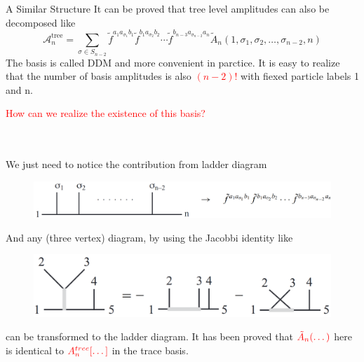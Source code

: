 \documentclass{beamer}
\begin{document}
\begin{frame}{A Similar Structure}
    It can be proved that tree level amplitudes can also be decomposed like 
\begin{equation*}
    \mathcal{A}_n^\text{tree}=\sum_{\sigma\in S_{n-2}}\tilde{f}^{a_1a_{\sigma_1}b_1}\tilde{f}^{b_1a_{\sigma_2}b_2}\cdots\tilde{f}^{b_{n-3}a_{\sigma_{n-2}}a_n}\tilde{A}_n(1,\sigma_1,\sigma_2,\ldots,\sigma_{n-2},n)
\end{equation*}
The basis is called DDM and more convenient in parctice. It is easy to realize that the number of basis amplitudes is also \textcolor{red}{$(n-2)!$} with fiexed particle labels 1 and n.
\end{frame}
\begin{frame}
    \begin{Large}
        \textcolor{red}{How can we realize the existence of this basis?}
    \end{Large}
\\ \hspace*{\fill}\\
We just need to notice the contribution from ladder diagram
\begin{figure}[htb]
    \centering
    \includegraphics[width=1\linewidth]{1.png}
\end{figure}
And any (three vertex) diagram, by using the Jacobbi identity like 
\begin{figure}[htb]
    \centering
    \includegraphics[width=1\linewidth]{2.png}
\end{figure}
can be transformed to the ladder diagram. It has been proved that $\textcolor{red}{\tilde{A}_n(\dots)}$ here is identical to $\textcolor{red}{A_n^{tree}[\dots]}$ in the trace basis.
\end{frame}
\end{document}
